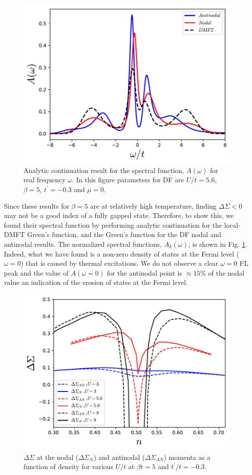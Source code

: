 \begin{figure}[ht]
\centering
    \includegraphics[width=0.9\linewidth]{fig3/spectral.pdf}
\caption {Analytic continuation result for the spectral function, $A(\omega)$ for real frequency $\omega$. In this figure parameters for DF are  $U/t=5.6$, $\beta =5$, $t^\prime =-0.3$ and $\mu=0$.
\label{fig:spectral_self}}
\end{figure}


Since these results for $\beta =5$ are at relatively high temperature, finding $\Delta \Sigma <0$ may not be a good index of a fully gapped state. Therefore, to show this, we found their spectral function by performing analytic continuation \cite{maxent} for the local-DMFT Green's function, and the Green's function for the DF nodal and antinodal results.  
The normalized spectral functions, $A_k(\omega)$, is shown in Fig. \ref{fig:spectral_self}. Indeed, what we have found is a non-zero density of states at the Fermi level ($\omega=0$) that is caused by thermal excitations. 
We do not observe a clear $\omega=0$ FL peak and the value of $A(\omega=0)$ for the antinodal point is $\approx 15\%$ of the nodal value an indication of the erosion of states at the Fermi level. 


\begin{figure}[ht]
\centering
    \includegraphics[width=0.8\linewidth]{fig3/deltasigma_all.pdf}
\caption{ $\Delta \Sigma$ at the nodal ($\Delta \Sigma_{N}$) and antinodal ($\Delta \Sigma_{AN}$)  momenta as a function of density for various $U/t$ at $\beta t=5$ and $t^\prime /t=-0.3$. 
\label{fig:deltasigma_all}}
\end{figure} 

